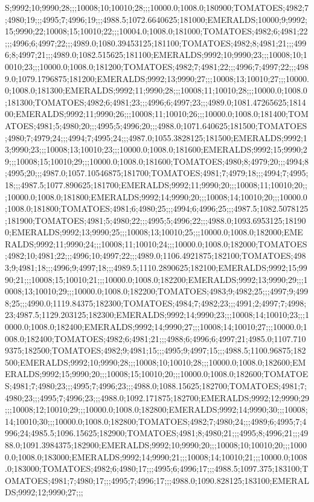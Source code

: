S;9992;10;9990;28;;;10008;10;10010;28;;;10000.0;1008.0;180900;TOMATOES;4982;7;4980;19;;;4995;7;4996;19;;;4988.5;1072.6640625;181000;EMERALDS;10000;9;9992;15;9990;22;10008;15;10010;22;;;10004.0;1008.0;181000;TOMATOES;4982;6;4981;22;;;4996;6;4997;22;;;4989.0;1080.39453125;181100;TOMATOES;4982;8;4981;21;;;4996;8;4997;21;;;4989.0;1082.515625;181100;EMERALDS;9992;10;9990;23;;;10008;10;10010;23;;;10000.0;1008.0;181200;TOMATOES;4982;7;4981;22;;;4996;7;4997;22;;;4989.0;1079.1796875;181200;EMERALDS;9992;13;9990;27;;;10008;13;10010;27;;;10000.0;1008.0;181300;EMERALDS;9992;11;9990;28;;;10008;11;10010;28;;;10000.0;1008.0;181300;TOMATOES;4982;6;4981;23;;;4996;6;4997;23;;;4989.0;1081.47265625;181400;EMERALDS;9992;11;9990;26;;;10008;11;10010;26;;;10000.0;1008.0;181400;TOMATOES;4981;5;4980;20;;;4995;5;4996;20;;;4988.0;1071.640625;181500;TOMATOES;4980;7;4979;24;;;4994;7;4995;24;;;4987.0;1055.3828125;181500;EMERALDS;9992;13;9990;23;;;10008;13;10010;23;;;10000.0;1008.0;181600;EMERALDS;9992;15;9990;29;;;10008;15;10010;29;;;10000.0;1008.0;181600;TOMATOES;4980;8;4979;20;;;4994;8;4995;20;;;4987.0;1057.10546875;181700;TOMATOES;4981;7;4979;18;;;4994;7;4995;18;;;4987.5;1077.890625;181700;EMERALDS;9992;11;9990;20;;;10008;11;10010;20;;;10000.0;1008.0;181800;EMERALDS;9992;14;9990;20;;;10008;14;10010;20;;;10000.0;1008.0;181800;TOMATOES;4981;6;4980;25;;;4994;6;4996;25;;;4987.5;1082.5078125;181900;TOMATOES;4981;5;4980;22;;;4995;5;4996;22;;;4988.0;1093.6953125;181900;EMERALDS;9992;13;9990;25;;;10008;13;10010;25;;;10000.0;1008.0;182000;EMERALDS;9992;11;9990;24;;;10008;11;10010;24;;;10000.0;1008.0;182000;TOMATOES;4982;10;4981;22;;;4996;10;4997;22;;;4989.0;1106.4921875;182100;TOMATOES;4983;9;4981;18;;;4996;9;4997;18;;;4989.5;1110.2890625;182100;EMERALDS;9992;15;9990;21;;;10008;15;10010;21;;;10000.0;1008.0;182200;EMERALDS;9992;13;9990;29;;;10008;13;10010;29;;;10000.0;1008.0;182200;TOMATOES;4983;9;4982;25;;;4997;9;4998;25;;;4990.0;1119.84375;182300;TOMATOES;4984;7;4982;23;;;4991;2;4997;7;4998;23;4987.5;1129.203125;182300;EMERALDS;9992;14;9990;23;;;10008;14;10010;23;;;10000.0;1008.0;182400;EMERALDS;9992;14;9990;27;;;10008;14;10010;27;;;10000.0;1008.0;182400;TOMATOES;4982;6;4981;21;;;4988;6;4996;6;4997;21;4985.0;1107.7109375;182500;TOMATOES;4982;9;4981;15;;;4995;9;4997;15;;;4988.5;1100.96875;182500;EMERALDS;9992;10;9990;28;;;10008;10;10010;28;;;10000.0;1008.0;182600;EMERALDS;9992;15;9990;20;;;10008;15;10010;20;;;10000.0;1008.0;182600;TOMATOES;4981;7;4980;23;;;4995;7;4996;23;;;4988.0;1088.15625;182700;TOMATOES;4981;7;4980;23;;;4995;7;4996;23;;;4988.0;1092.171875;182700;EMERALDS;9992;12;9990;29;;;10008;12;10010;29;;;10000.0;1008.0;182800;EMERALDS;9992;14;9990;30;;;10008;14;10010;30;;;10000.0;1008.0;182800;TOMATOES;4982;7;4980;24;;;4989;6;4995;7;4996;24;4985.5;1096.15625;182900;TOMATOES;4981;8;4980;21;;;4995;8;4996;21;;;4988.0;1091.3984375;182900;EMERALDS;9992;10;9990;20;;;10008;10;10010;20;;;10000.0;1008.0;183000;EMERALDS;9992;14;9990;21;;;10008;14;10010;21;;;10000.0;1008.0;183000;TOMATOES;4982;6;4980;17;;;4995;6;4996;17;;;4988.5;1097.375;183100;TOMATOES;4981;7;4980;17;;;4995;7;4996;17;;;4988.0;1090.828125;183100;EMERALDS;9992;12;9990;27;;;